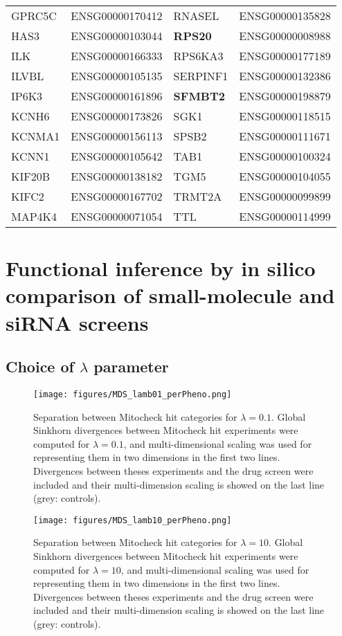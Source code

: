 \begin{table}[!ht]
\begin{tabular}{|l|l||l|l|}
GPRC5C  &  ENSG00000170412  &  RNASEL  &  ENSG00000135828  \\
HAS3  &  ENSG00000103044  &  \textbf{RPS20 } &  ENSG00000008988  \\
ILK  &  ENSG00000166333  &  RPS6KA3  &  ENSG00000177189  \\
ILVBL  &  ENSG00000105135  &  SERPINF1  &  ENSG00000132386  \\
IP6K3  &  ENSG00000161896  &  \textbf{SFMBT2}  &  ENSG00000198879  \\
KCNH6  &  ENSG00000173826  &  SGK1  &  ENSG00000118515  \\
KCNMA1  &  ENSG00000156113  &  SPSB2  &  ENSG00000111671  \\
KCNN1  &  ENSG00000105642  &  TAB1  &  ENSG00000100324  \\
KIF20B  &  ENSG00000138182  &  TGM5  &  ENSG00000104055  \\
KIFC2  &  ENSG00000167702  &  TRMT2A  &  ENSG00000099899  \\
MAP4K4  &  ENSG00000071054  &  TTL  &  ENSG00000114999  \\

\hline
\end{tabular}
\end{table}
\clearpage
\section{Functional inference by in silico comparison of small-molecule and siRNA screens}
\subsection{Choice of $\lambda$ parameter}
\label{choice_param_Sinkhorn}
\begin{figure*}[ht!]
\centerline{
\texttt{[image: figures/MDS\_lamb01\_perPheno.png]}
}
\caption{Separation between Mitocheck hit categories for $\lambda=0.1$. Global Sinkhorn divergences between Mitocheck hit experiments were computed for $\lambda=0.1$, and multi-dimensional scaling was used for representing them in two dimensions in the first two lines. Divergences between theses experiments and the drug screen were included and their multi-dimension scaling is showed on the last line (grey: controls).}
\label{lambda_choice2}
\end{figure*}
\begin{figure*}[ht!]
\centerline{
\texttt{[image: figures/MDS\_lamb10\_perPheno.png]}}
\caption{Separation between Mitocheck hit categories for $\lambda=10$. Global Sinkhorn divergences between Mitocheck hit experiments were computed for $\lambda=10$, and multi-dimensional scaling was used for representing them in two dimensions in the first two lines. Divergences between theses experiments and the drug screen were included and their multi-dimension scaling is showed on the last line (grey: controls).}
\label{lambda_choice3}
\end{figure*}

